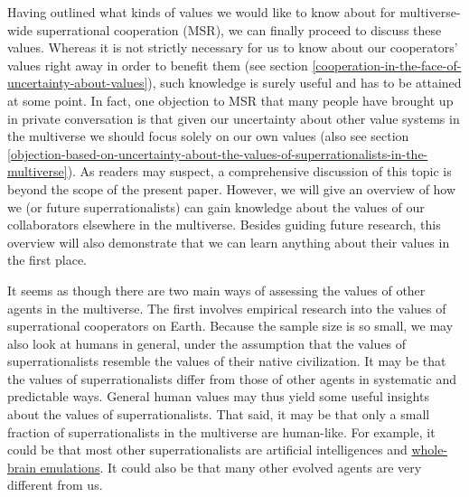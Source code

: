 Having outlined what kinds of values we would like to know about for
multiverse-wide superrational cooperation (MSR), we can finally proceed to
discuss these values. Whereas it is not strictly necessary for us to
know about our cooperators' values right away in order to benefit them
(see section
\ref{cooperation-in-the-face-of-uncertainty-about-values}), such
knowledge is surely useful and has to be attained at some point. In
fact, one objection to MSR that many
people have brought up in private conversation is that given our
uncertainty about other value systems in the multiverse we should focus
solely on our own values (also see section
\ref{objection-based-on-uncertainty-about-the-values-of-superrationalists-in-the-multiverse}). As readers may suspect, a comprehensive discussion of
this topic is beyond the scope of the present paper. However, we will
give an overview of how we (or future superrationalists) can gain
knowledge about the values of our collaborators elsewhere in the
multiverse. Besides guiding future research, this overview will also
demonstrate that we can learn anything about their values in the first
place.

It seems as though there are two main ways of assessing the values of
other agents in the multiverse. The first involves empirical research
into the values of superrational cooperators on Earth. Because the
sample size is so small, we may also look at humans in general, under
the assumption that the values of superrationalists resemble the values
of their native civilization. It may be that the values of
superrationalists differ from those of other agents in systematic and
predictable ways. General human values may thus yield some useful
insights about the values of superrationalists. That said, it may be
that only a small fraction of superrationalists in the multiverse are
human-like. For example, it could be that most other superrationalists
are artificial intelligences and
\href{https://en.wikipedia.org/wiki/Mind_uploading}{whole-brain
emulations}. It could also be that many other evolved agents are very
different from us.

